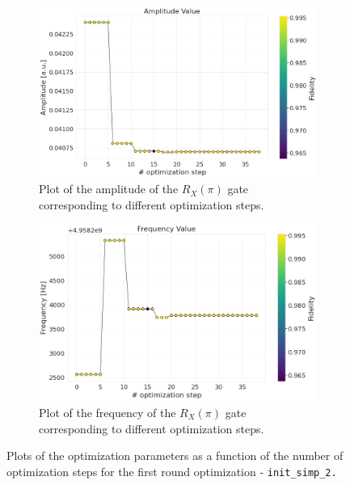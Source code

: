 \begin{figure}[h!]
    \centering
    \begin{subfigure}[t]{0.495\textwidth}
        \includegraphics[width=\textwidth]{figures/png/RB_optimization/NM/InitialSymplex/20241110_211211/amplitude.png}
        \caption{Plot of the amplitude of the $R_X(\pi)$ gate corresponding to different optimization steps.}
        \label{fig:20241110_211211:amplitude}
    \end{subfigure}
    \hfill
    \begin{subfigure}[t]{0.495\textwidth}
        \includegraphics[width=\textwidth]{figures/png/RB_optimization/NM/InitialSymplex/20241110_211211/frequency.png}
        \caption{Plot of the frequency of the $R_X(\pi)$ gate corresponding to different optimization steps.}
        \label{fig:20241110_211211:frequency}
    \end{subfigure}
    \caption{Plots of the optimization parameters as a function of the number of optimization steps for the first round optimization - \tt{init\_simp\_2}.}
    \label{fig:20241110_211211:parameters}
\end{figure}


